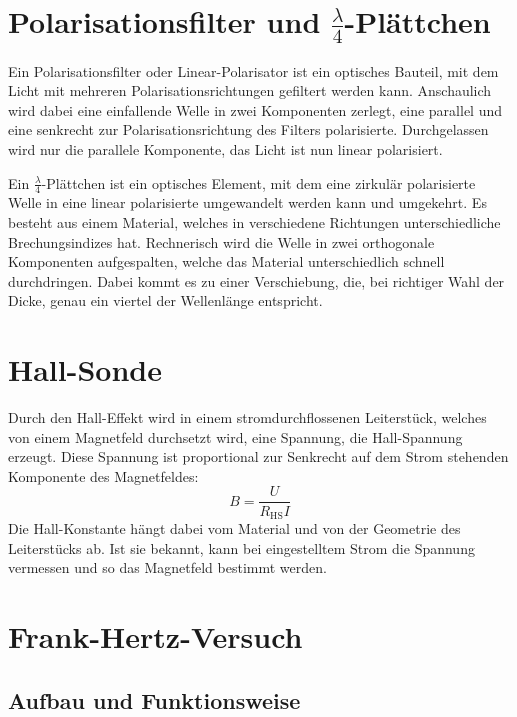 \section{Polarisationsfilter und $\frac{\lambda}4$-Plättchen}

Ein Polarisationsfilter oder Linear-Polarisator ist ein optisches Bauteil, mit
dem Licht mit mehreren Polarisationsrichtungen gefiltert werden kann.
Anschaulich wird dabei eine einfallende Welle in zwei Komponenten zerlegt, eine
parallel und eine senkrecht zur Polarisationsrichtung des Filters polarisierte.
Durchgelassen wird nur die parallele Komponente, das Licht ist nun linear
polarisiert.

Ein $\frac\lambda4$-Plättchen ist ein optisches Element, mit dem eine zirkulär
polarisierte Welle in eine linear polarisierte umgewandelt werden kann und
umgekehrt. Es besteht aus einem Material, welches in verschiedene Richtungen
unterschiedliche Brechungsindizes hat. Rechnerisch wird die Welle in zwei
orthogonale Komponenten aufgespalten, welche das Material unterschiedlich
schnell durchdringen. Dabei kommt es zu einer Verschiebung, die, bei richtiger
Wahl der Dicke, genau ein viertel der Wellenlänge entspricht.

\section{Hall-Sonde}

Durch den Hall-Effekt wird in einem stromdurchflossenen Leiterstück, welches
von einem Magnetfeld durchsetzt wird, eine Spannung, die Hall-Spannung erzeugt.
Diese Spannung ist proportional zur Senkrecht auf dem Strom stehenden
Komponente des Magnetfeldes:
\[
    B = \frac{U}{R_\text{HS}I}
\]
Die Hall-Konstante hängt dabei vom Material und von der Geometrie des
Leiterstücks ab. Ist sie bekannt, kann bei eingestelltem Strom die Spannung
vermessen und so das Magnetfeld bestimmt werden.

\section{Frank-Hertz-Versuch}

\subsection{Aufbau und Funktionsweise}
\label{ssec:Aufbau_FH}

